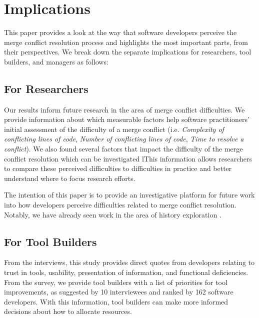 \section{Implications}\label{implications}

This paper provides a look at the way that software developers perceive the merge conflict resolution process and highlights the most important parts, from their perspectives. We break down the separate implications for researchers, tool builders, and managers as follows:

\subsection{For Researchers}
Our results inform future research in the area of merge conflict difficulties.
We provide information about which measurable factors help software practitioners' initial assessment of the difficulty of a merge conflict (i.e. \textit{Complexity of conflicting lines of code}, \textit{Number of conflicting lines of code}, \textit{Time to resolve a conflict}). We also found several factors that impact the difficulty of the merge conflict resolution which can be investigated lThis information allows researchers to compare these perceived difficulties to difficulties in practice and better understand where to focus research efforts.
 
The intention of this paper is to provide an investigative platform for future work into how developers perceive difficulties related to merge conflict resolution. Notably, we have already seen work in the area of history exploration \cite{mihai_lenses}.

\subsection{For Tool Builders}
From the interviews, this study provides direct quotes from developers relating to trust in tools, usability, presentation of information, and functional deficiencies. From the survey, we provide tool builders with a list of priorities for tool improvements, as suggested by 10 interviewees and ranked by 162 software developers. With this information, tool builders can make more informed decisions about how to allocate resources.

